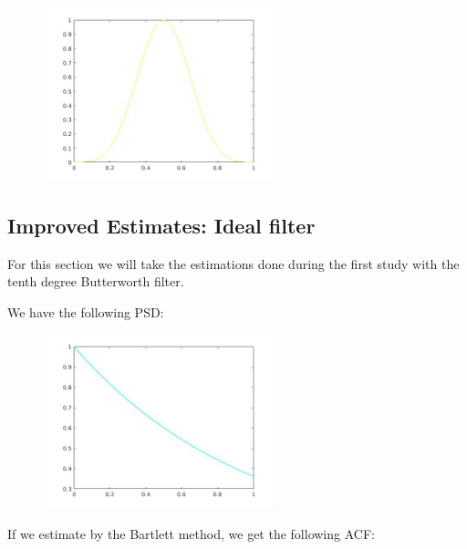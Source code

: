 \documentclass[a4paper,11pt]{article}
\begin{document}
\begin{figure}[!hp]
    \begin{center}
      \includegraphics[width=0.6\textwidth]{images/lab2_5.jpg}
    \end{center}
\end{figure}

\newpage

\subsection{Improved Estimates: Ideal filter}

For this section we will take the estimations done during the first study with the tenth degree Butterworth filter.

We have the following PSD:

\begin{figure}[!hp]
    \begin{center}
      \includegraphics[width=0.6\textwidth]{images/lab2_12.jpg}
    \end{center}
\end{figure}

If we estimate by the Bartlett method, we get the following ACF:
\end{document}

